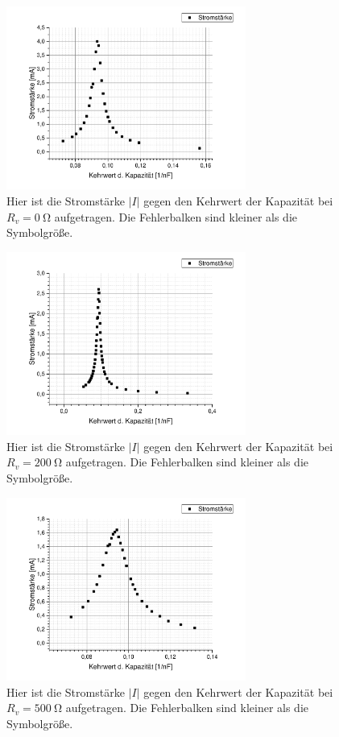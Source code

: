 \documentclass[
	a4paper,
	12pt,
	pagesize,
	ngerman
]{scrartcl}
\begin{document}
	\begin{figure}[H]
		\includegraphics[width=0.7\textwidth]{Serie_0}
		\centering
		\caption{Hier ist die Stromstärke $ \left| I \right| $ gegen den Kehrwert der Kapazität bei $ R_v = \SI{0}{\ohm} $ aufgetragen. Die Fehlerbalken sind kleiner als die Symbolgröße.}
		\label{Serie_0}
		\centering
	\end{figure} 
	\begin{figure}[H]
		\includegraphics[width=0.7\textwidth]{Serie_200}
		\centering
		\caption{Hier ist die Stromstärke $ \left| I \right| $ gegen den Kehrwert der Kapazität bei $ R_v = \SI{200}{\ohm} $  aufgetragen. Die Fehlerbalken sind kleiner als die Symbolgröße.}
		\label{Serie_200}
		\centering
	\end{figure} 
	\begin{figure}[H]
		\includegraphics[width=0.7\textwidth]{Serie_500}
		\centering
		\caption{Hier ist die Stromstärke $ \left| I \right| $ gegen den Kehrwert der Kapazität bei $ R_v = \SI{500}{\ohm} $ aufgetragen. Die Fehlerbalken sind kleiner als die Symbolgröße.}
		\label{Serie_500}
		\centering
	\end{figure} 
\end{document}
